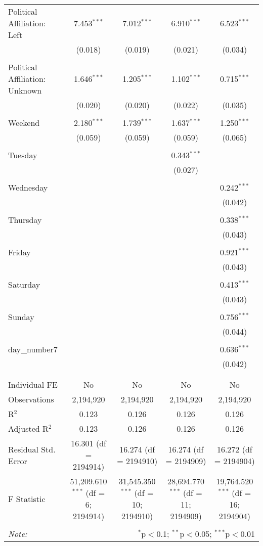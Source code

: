\documentclass[
]{article}
\begin{document}
\begin{table}[!htbp]
{\begin{tabular}{@{\extracolsep{5pt}}lcccc}
 Political Affiliation: Left & 7.453$^{***}$ & 7.012$^{***}$ & 6.910$^{***}$ & 6.523$^{***}$ \\ 
  & (0.018) & (0.019) & (0.021) & (0.034) \\ 
  & & & & \\ 
 Political Affiliation: Unknown & 1.646$^{***}$ & 1.205$^{***}$ & 1.102$^{***}$ & 0.715$^{***}$ \\ 
  & (0.020) & (0.020) & (0.022) & (0.035) \\ 
  & & & & \\ 
 Weekend & 2.180$^{***}$ & 1.739$^{***}$ & 1.637$^{***}$ & 1.250$^{***}$ \\ 
  & (0.059) & (0.059) & (0.059) & (0.065) \\ 
  & & & & \\ 
 Tuesday &  &  & 0.343$^{***}$ &  \\ 
  &  &  & (0.027) &  \\ 
  & & & & \\ 
 Wednesday &  &  &  & 0.242$^{***}$ \\ 
  &  &  &  & (0.042) \\ 
  & & & & \\ 
 Thursday &  &  &  & 0.338$^{***}$ \\ 
  &  &  &  & (0.043) \\ 
  & & & & \\ 
 Friday &  &  &  & 0.921$^{***}$ \\ 
  &  &  &  & (0.043) \\ 
  & & & & \\ 
 Saturday &  &  &  & 0.413$^{***}$ \\ 
  &  &  &  & (0.043) \\ 
  & & & & \\ 
 Sunday &  &  &  & 0.756$^{***}$ \\ 
  &  &  &  & (0.044) \\ 
  & & & & \\ 
 day\_number7 &  &  &  & 0.636$^{***}$ \\ 
  &  &  &  & (0.042) \\ 
  & & & & \\ 
\hline \\[-1.8ex] 
Individual FE & No & No & No & No \\ 
Observations & 2,194,920 & 2,194,920 & 2,194,920 & 2,194,920 \\ 
R$^{2}$ & 0.123 & 0.126 & 0.126 & 0.126 \\ 
Adjusted R$^{2}$ & 0.123 & 0.126 & 0.126 & 0.126 \\ 
Residual Std. Error & 16.301 (df = 2194914) & 16.274 (df = 2194910) & 16.274 (df = 2194909) & 16.272 (df = 2194904) \\ 
F Statistic & 51,209.610$^{***}$ (df = 6; 2194914) & 31,545.350$^{***}$ (df = 10; 2194910) & 28,694.770$^{***}$ (df = 11; 2194909) & 19,764.520$^{***}$ (df = 16; 2194904) \\ 
\hline 
\hline \\[-1.8ex] 
\textit{Note:}  & \multicolumn{4}{r}{$^{*}$p$<$0.1; $^{**}$p$<$0.05; $^{***}$p$<$0.01} \\ 
\end{tabular}
} 
\end{table} 
\newpage
\end{document}
